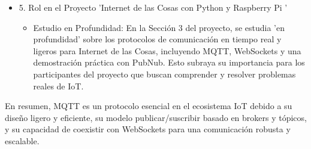 \documentclass{report}
\begin{document}
\begin{itemize}
    \item 5. Rol en el Proyecto 'Internet de las Cosas con Python y Raspberry Pi '
    \begin{itemize}
        \item Estudio en Profundidad: En la Sección 3 del proyecto, se estudia   'en profundidad'  sobre los protocolos de comunicación en tiempo 
        real y ligeros para Internet de las Cosas, incluyendo MQTT, WebSockets y una demostración práctica con PubNub. Esto subraya su importancia 
        para los participantes del proyecto que buscan comprender y resolver problemas reales de IoT.
    \end{itemize}
\end{itemize}
En resumen, MQTT es un protocolo esencial en el ecosistema IoT debido a su diseño ligero y eficiente, su modelo publicar/suscribir basado en 
brokers y tópicos, y su capacidad de coexistir con WebSockets para una comunicación robusta y escalable.
\end{document}
